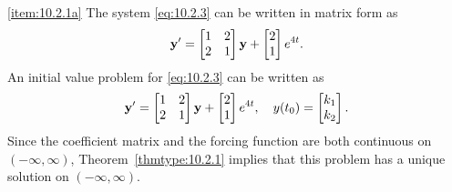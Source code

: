 \documentclass{ximera}
\begin{document}
\begin{example}
\begin{explanation}
\ref{item:10.2.1a}
The system  \eqref{eq:10.2.3} can be written in matrix form as
$$
{\bf y}'=\begin{bmatrix}1&2\\2&1\end{bmatrix}{\bf y}+\begin{bmatrix}2\\1\end{bmatrix}e^{4t}.
$$
An initial value problem for \eqref{eq:10.2.3} can be written as
$$
{\bf y}'=\begin{bmatrix}1&2\\2&1\end{bmatrix}{\bf y}+\begin{bmatrix}2\\1\end{bmatrix}e^{4t}, \quad
y(t_0)=\begin{bmatrix}k_1\\k_2\end{bmatrix}.
$$
Since the coefficient matrix and the forcing function are both
continuous on $(-\infty,\infty)$, Theorem~\ref{thmtype:10.2.1} implies that
this problem has a unique solution on $(-\infty,\infty)$.


\end{explanation}
\end{example}
\end{document}
